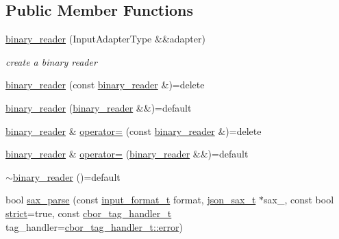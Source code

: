 \subsection*{Public Member Functions}
\begin{DoxyCompactItemize}
\item 
\hyperlink{classnlohmann_1_1detail_1_1binary__reader_ad7cb69186e01b77ec021e83137461457}{binary\+\_\+reader} (Input\+Adapter\+Type \&\&adapter)
\begin{DoxyCompactList}\small\item\em create a binary reader \end{DoxyCompactList}\item 
\hyperlink{classnlohmann_1_1detail_1_1binary__reader_ab29d56b1e980a7b9a3383cf1ce862d1b}{binary\+\_\+reader} (const \hyperlink{classnlohmann_1_1detail_1_1binary__reader}{binary\+\_\+reader} \&)=delete
\item 
\hyperlink{classnlohmann_1_1detail_1_1binary__reader_acca2c4076df85f27dc1c904475e05c26}{binary\+\_\+reader} (\hyperlink{classnlohmann_1_1detail_1_1binary__reader}{binary\+\_\+reader} \&\&)=default
\item 
\hyperlink{classnlohmann_1_1detail_1_1binary__reader}{binary\+\_\+reader} \& \hyperlink{classnlohmann_1_1detail_1_1binary__reader_a35abcd6b3231a4c9d651f9c0eb610c96}{operator=} (const \hyperlink{classnlohmann_1_1detail_1_1binary__reader}{binary\+\_\+reader} \&)=delete
\item 
\hyperlink{classnlohmann_1_1detail_1_1binary__reader}{binary\+\_\+reader} \& \hyperlink{classnlohmann_1_1detail_1_1binary__reader_ad3dc8b0f8ef6035465c14ed7dcbb67d4}{operator=} (\hyperlink{classnlohmann_1_1detail_1_1binary__reader}{binary\+\_\+reader} \&\&)=default
\item 
\hyperlink{classnlohmann_1_1detail_1_1binary__reader_a359031cba136452d9030ed9ab4517b74}{$\sim$binary\+\_\+reader} ()=default
\item 
bool \hyperlink{classnlohmann_1_1detail_1_1binary__reader_ab4afd9ee276bbb15a0f898061aad94dd}{sax\+\_\+parse} (const \hyperlink{namespacenlohmann_1_1detail_aa554fc6a11519e4f347deb25a9f0db40}{input\+\_\+format\+\_\+t} format, \hyperlink{classnlohmann_1_1detail_1_1binary__reader_a4c33ab78a0df5afd524f16887550436d}{json\+\_\+sax\+\_\+t} $\ast$sax\+\_\+, const bool \hyperlink{namespacenlohmann_1_1detail_a5a76b60b26dc8c47256a996d18d967dfa2133fd717402a7966ee88d06f9e0b792}{strict}=true, const \hyperlink{namespacenlohmann_1_1detail_a58bb1ef1a9ad287a9cfaf1855784d9ac}{cbor\+\_\+tag\+\_\+handler\+\_\+t} tag\+\_\+handler=\hyperlink{namespacenlohmann_1_1detail_a58bb1ef1a9ad287a9cfaf1855784d9acacb5e100e5a9a3e7f6d1fd97512215282}{cbor\+\_\+tag\+\_\+handler\+\_\+t\+::error})
\end{DoxyCompactItemize}
